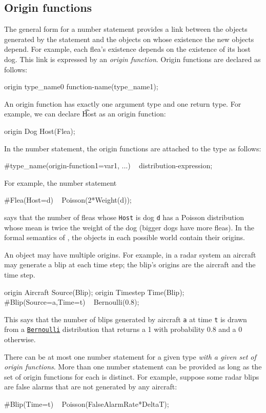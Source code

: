 \documentclass[12pt]{article}
\begin{document}
\subsection{Origin functions}\label{origin-section}
The general form for a number statement provides a link between the objects generated by the statement
and the objects on whose existence the new objects depend. For example, each flea's existence
depends on the existence of its host dog. This link is expressed by an {\em origin function}.
Origin functions are declared as follows:
\begin{blogcode}
origin type_name0 function-name(type_name1);
\end{blogcode}
An origin function has exactly one argument type and one return type.  
For example, we can declare {\t Host} as an origin function:
\begin{blogcode}
origin Dog Host(Flea);
\end{blogcode}

In the number statement, the origin functions are attached to the type 
as follows:
\begin{blogcode}
#type_name(origin-function1=var1, ...) ~ distribution-expression;
\end{blogcode}
For example, the number statement
\begin{blogcode}
#Flea(Host=d) ~ Poisson(2*Weight(d));
\end{blogcode}
says that the number of fleas whose {\tt Host} is dog {\tt d} has a Poisson distribution whose mean is twice the weight of the dog (bigger dogs have more fleas).
In the formal semantics of \bl, the objects in each possible world contain their origins.

An object may have multiple origins. For example, in a radar system an aircraft may generate a blip at each time step; the blip's origins are the aircraft and the time step.
\begin{blogcode}
origin Aircraft Source(Blip);
origin Timestep Time(Blip);
#Blip(Source=a,Time=t) ~ Bernoulli(0.8);
\end{blogcode}
This says that the number of blips generated by aircraft {\tt a} at time {\tt t} is drawn from
a \hyperref[builtin-distribution-appendix]{{\tt Bernoulli}} distribution that returns a 1 with probability 0.8 and a 0 otherwise.

There can be at most one number statement for a given type {\em with a given set of origin functions}. More than one number statement
can be provided as long as the set of origin functions for each is distinct. For example, suppose some radar blips are false alarms
that are not generated by any aircraft:
\begin{blogcode}
#Blip(Time=t) ~ Poisson(FalseAlarmRate*DeltaT);
\end{blogcode}
\end{document}

